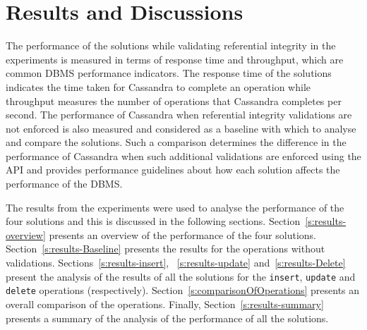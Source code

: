 \chapter{Results and Discussions}


The performance of the solutions while validating referential integrity in the
experiments is measured in terms of response time and throughput,  which are
common \ac{DBMS} performance indicators. The response time of the solutions
indicates the time taken for Cassandra to complete an operation while throughput
measures the number of operations that Cassandra completes per second.
The performance of Cassandra when referential integrity validations are not
enforced is also measured and considered as a baseline with which to analyse and
compare the solutions.  Such a comparison determines the difference in the
performance of Cassandra when such additional validations are enforced using the
\ac{API} and provides performance guidelines about how each solution affects the
performance of the \ac{DBMS}.

 The results from the experiments were used to
analyse the performance of the four solutions  and this is discussed in the
following sections. 
Section~\ref{s:results-overview} presents an overview of the  performance of the
four solutions. 
Section~\ref{s:results-Baseline} presents the results for the operations
without validations. 
Sections~\ref{s:results-insert}, ~\ref{s:results-update}
and~\ref{s:results-Delete} present the analysis  of the results
of all the solutions for the \texttt{insert},  \texttt{update} and
\texttt{delete} operations (respectively).  
Section~\ref{s:comparisonOfOperations} presents an overall comparison of the
operations. 
 Finally,  Section~\ref{s:results-summary} presents a summary of the
analysis of the performance of all the solutions. 

\newcommand{\Width}{0.5\textwidth}
\newcommand{\TB}[1]{\textbf{#1}} 




 




